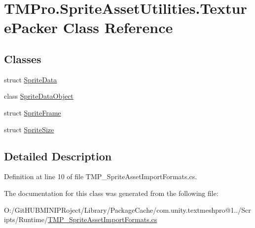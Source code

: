\hypertarget{class_t_m_pro_1_1_sprite_asset_utilities_1_1_texture_packer}{}\section{T\+M\+Pro.\+Sprite\+Asset\+Utilities.\+Texture\+Packer Class Reference}
\label{class_t_m_pro_1_1_sprite_asset_utilities_1_1_texture_packer}
\subsection*{Classes}
\begin{DoxyCompactItemize}
\item 
struct \mbox{\hyperlink{struct_t_m_pro_1_1_sprite_asset_utilities_1_1_texture_packer_1_1_sprite_data}{Sprite\+Data}}
\item 
class \mbox{\hyperlink{class_t_m_pro_1_1_sprite_asset_utilities_1_1_texture_packer_1_1_sprite_data_object}{Sprite\+Data\+Object}}
\item 
struct \mbox{\hyperlink{struct_t_m_pro_1_1_sprite_asset_utilities_1_1_texture_packer_1_1_sprite_frame}{Sprite\+Frame}}
\item 
struct \mbox{\hyperlink{struct_t_m_pro_1_1_sprite_asset_utilities_1_1_texture_packer_1_1_sprite_size}{Sprite\+Size}}
\end{DoxyCompactItemize}


\subsection{Detailed Description}


Definition at line 10 of file T\+M\+P\+\_\+\+Sprite\+Asset\+Import\+Formats.\+cs.



The documentation for this class was generated from the following file\+:\begin{DoxyCompactItemize}
\item 
O\+:/\+Git\+H\+U\+B\+M\+I\+N\+I\+P\+Roject/\+Library/\+Package\+Cache/com.\+unity.\+textmeshpro@1../\+Scripts/\+Runtime/\mbox{\hyperlink{_t_m_p___sprite_asset_import_formats_8cs}{T\+M\+P\+\_\+\+Sprite\+Asset\+Import\+Formats.\+cs}}\end{DoxyCompactItemize}
